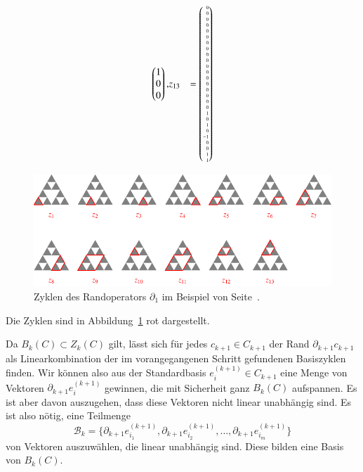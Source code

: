 \begin{beispiel}
{\begin{align*}
\begin{pmatrix*}[r]
 1\\ %
 0\\
 0
\end{pmatrix*},
&z_{13} %
&=
\tiny
\begin{pmatrix*}[r]
 0\\
 0\\
 0\\
 0\\
 0\\
 0\\
 0\\
 0\\
 0\\
 0\\
 0\\
 0\\
 0\\
 0\\
 0\\
 0\\
 0\\
 0\\
 1\\
 0\\ %
 1\\
 0\\
-1\\
 0\\
 0\\ %
 1\\
 1
\end{pmatrix*}
\end{align*}
}
\begin{figure}
\centering
\includegraphics{chapters/95-homologie/images/homocycles.pdf}
\caption{Zyklen des Randoperators $\partial_1$ im Beispiel von
Seite~\pageref{buch:homologie:beispiel:gausshomo}.
\label{buch:homologie:fig:homocycles}}
\end{figure}
Die Zyklen sind in Abbildung~\ref{buch:homologie:fig:homocycles} {\color{red}rot} dargestellt.
\end{beispiel}

Da $B_k(C)\subset Z_k(C)$ gilt, lässt sich für jedes $c_{k+1}\in C_{k+1}$
der Rand $\partial_{k+1}c_{k+1}$ als Linearkombination der im 
vorangegangenen Schritt gefundenen Basiszyklen finden.
Wir können also aus der Standardbasis $e^{(k+1)}_i\in C_{k+1}$ eine Menge
von Vektoren $\partial_{k+1}e^{(k+1)}_i$ gewinnen, die mit Sicherheit
ganz $B_k(C)$ aufspannen.
Es ist aber davon auszugehen, dass diese Vektoren nicht linear unabhängig
sind.
Es ist also nötig, eine Teilmenge
\[
\mathcal{B}_k
=
\{
\partial_{k+1}e^{(k+1)}_{i_1},
\partial_{k+1}e^{(k+1)}_{i_2},
\dots,
\partial_{k+1}e^{(k+1)}_{i_m}
\}
\]
von Vektoren auszuwählen, die linear
unabhängig sind.
Diese bilden eine Basis von $B_k(C)$.

